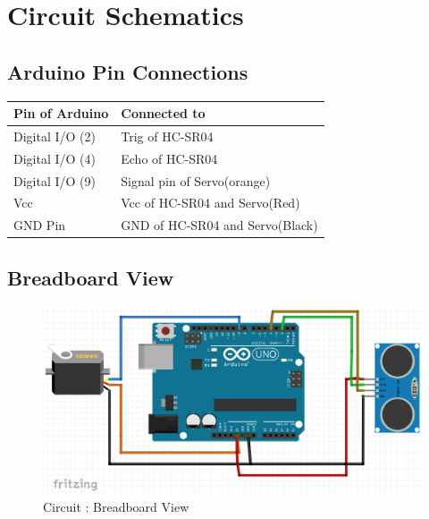 \chapter{Circuit Schematics}\label{ch:chschematic}
\section{Arduino Pin Connections}
\begin{table}[H]
	\centering
	\begin{tabular}{|l|l|}
		\hline
		Pin of Arduino &Connected to\\
		\hline
		Digital I/O (2) &Trig of HC-SR04\\
		\hline
		Digital I/O (4)  &Echo of HC-SR04\\
		\hline
		Digital I/O (9) &Signal pin of Servo(orange)\\
		\hline
		Vcc &Vcc of HC-SR04 and Servo(Red)\\
		\hline
		GND Pin &GND of HC-SR04 and Servo(Black)\\
		\hline
	\end{tabular}
\end{table}
\section{Breadboard View}
\begin{figure}[H]
	\vfill
	\centering
	\includegraphics[width=\textwidth]{../Files/bboard}
	\caption{Circuit : Breadboard View}  \label{fig:bboard}
\end{figure}
